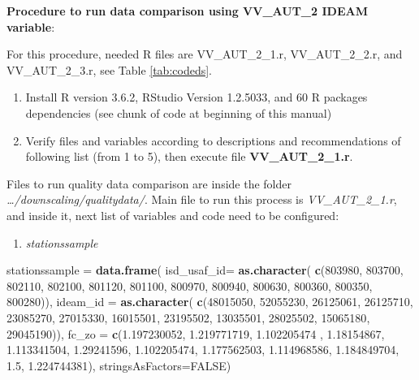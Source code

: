 \documentclass[12pt,oneside]{reedthesis}
\newenvironment{Shaded}{\begin{snugshade}}{\end{snugshade}}
\newcommand{\DataTypeTok}[1]{\textcolor[rgb]{0.13,0.29,0.53}{#1}}
\newcommand{\DecValTok}[1]{\textcolor[rgb]{0.00,0.00,0.81}{#1}}
\newcommand{\FloatTok}[1]{\textcolor[rgb]{0.00,0.00,0.81}{#1}}
\newcommand{\KeywordTok}[1]{\textcolor[rgb]{0.13,0.29,0.53}{\textbf{#1}}}
\newcommand{\NormalTok}[1]{#1}
\newcommand{\OtherTok}[1]{\textcolor[rgb]{0.56,0.35,0.01}{#1}}
\newcommand{\StringTok}[1]{\textcolor[rgb]{0.31,0.60,0.02}{#1}}
\providecommand{\tightlist}{%
  \setlength{\itemsep}{0pt}\setlength{\parskip}{0pt}}
\begin{document}
\textbf{Procedure to run data comparison using VV\_AUT\_2 IDEAM variable}:

For this procedure, needed R files are VV\_AUT\_2\_1.r, VV\_AUT\_2\_2.r, and VV\_AUT\_2\_3.r, see Table \ref{tab:codeds}.
\begin{enumerate}
\def\labelenumi{\arabic{enumi}.}
\item
  Install R version 3.6.2, RStudio Version 1.2.5033, and 60 R packages dependencies (see chunk of code at beginning of this manual)
\item
  Verify files and variables according to descriptions and recommendations of following list (from 1 to 5), then execute file \textbf{VV\_AUT\_2\_1.r}.
\end{enumerate}
Files to run quality data comparison are inside the folder \emph{\ldots/downscaling/qualitydata/}. Main file to run this process is \emph{VV\_AUT\_2\_1.r}, and inside it, next list of variables and code need to be configured:
\begin{enumerate}
\def\labelenumi{\arabic{enumi}.}
\tightlist
\item
  \emph{stationssample}
\end{enumerate}
\scriptsize

\vspace{0.4cm}
\begin{Shaded}
\begin{Highlighting}[]
\NormalTok{    stationssample =}\StringTok{ }\KeywordTok{data.frame}\NormalTok{(}
      \DataTypeTok{isd_usaf_id=} \KeywordTok{as.character}\NormalTok{(}
        \KeywordTok{c}\NormalTok{(}\DecValTok{803980}\NormalTok{, }\DecValTok{803700}\NormalTok{, }\DecValTok{802110}\NormalTok{, }\DecValTok{802100}\NormalTok{, }\DecValTok{801120}\NormalTok{, }\DecValTok{801100}\NormalTok{, }
          \DecValTok{800970}\NormalTok{, }\DecValTok{800940}\NormalTok{, }\DecValTok{800630}\NormalTok{, }\DecValTok{800360}\NormalTok{, }\DecValTok{800350}\NormalTok{, }\DecValTok{800280}\NormalTok{)), }
      \DataTypeTok{ideam_id =} \KeywordTok{as.character}\NormalTok{(}
        \KeywordTok{c}\NormalTok{(}\DecValTok{48015050}\NormalTok{, }\DecValTok{52055230}\NormalTok{, }\DecValTok{26125061}\NormalTok{, }\DecValTok{26125710}\NormalTok{, }\DecValTok{23085270}\NormalTok{, }\DecValTok{27015330}\NormalTok{, }
          \DecValTok{16015501}\NormalTok{, }\DecValTok{23195502}\NormalTok{, }\DecValTok{13035501}\NormalTok{, }\DecValTok{28025502}\NormalTok{, }\DecValTok{15065180}\NormalTok{, }\DecValTok{29045190}\NormalTok{)),}
      \DataTypeTok{fc_zo =} 
        \KeywordTok{c}\NormalTok{(}\FloatTok{1.197230052}\NormalTok{, }\FloatTok{1.219771719}\NormalTok{, }\FloatTok{1.102205474}\NormalTok{ , }\FloatTok{1.18154867}\NormalTok{, }\FloatTok{1.113341504}\NormalTok{, }\FloatTok{1.29241596}\NormalTok{, }
          \FloatTok{1.102205474}\NormalTok{, }\FloatTok{1.177562503}\NormalTok{, }\FloatTok{1.114968586}\NormalTok{, }\FloatTok{1.184849704}\NormalTok{, }\FloatTok{1.5}\NormalTok{, }\FloatTok{1.224744381}\NormalTok{),  }
      \DataTypeTok{stringsAsFactors=}\OtherTok{FALSE}\NormalTok{)}
\end{Highlighting}
\end{Shaded}
\normalsize
\end{document}

